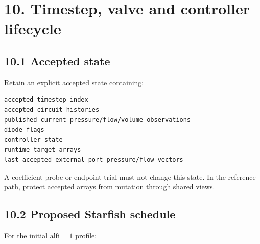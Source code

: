 \documentclass[11pt,a4paper]{article}
\begin{document}
\section{10. Timestep, valve and controller lifecycle}
\subsection{10.1 Accepted state}
Retain an explicit accepted state containing:


\begin{lstlisting}
accepted timestep index
accepted circuit histories
published current pressure/flow/volume observations
diode flags
controller state
runtime target arrays
last accepted external port pressure/flow vectors
\end{lstlisting}
A coefficient probe or endpoint trial must not change this state. In the reference path, protect accepted arrays from mutation through shared views.

\subsection{10.2 Proposed Starfish schedule}
For the initial \(\mathrm{alfi}=1\) profile:
\end{document}
